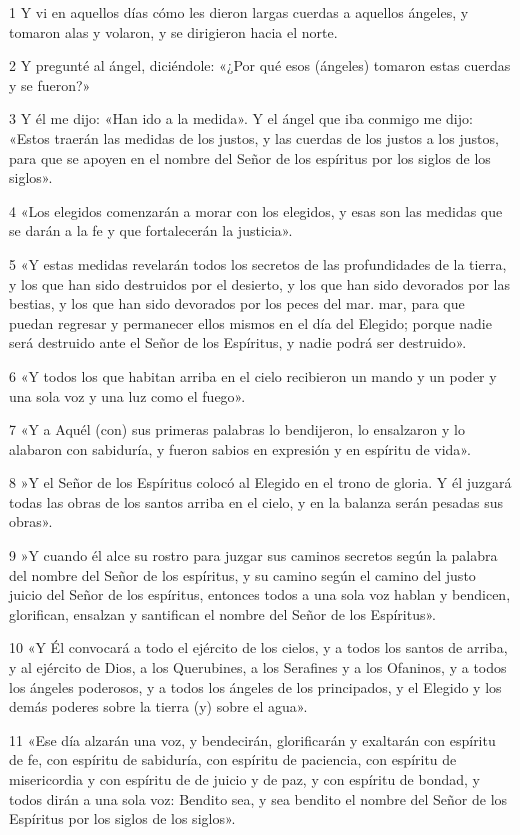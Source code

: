 \par 1 Y vi en aquellos días cómo les dieron largas cuerdas a aquellos ángeles, y tomaron alas y volaron, y se dirigieron hacia el norte.
\par 2 Y pregunté al ángel, diciéndole: «¿Por qué esos (ángeles) tomaron estas cuerdas y se fueron?»
\par 3 Y él me dijo: «Han ido a la medida». Y el ángel que iba conmigo me dijo: «Estos traerán las medidas de los justos, y las cuerdas de los justos a los justos, para que se apoyen en el nombre del Señor de los espíritus por los siglos de los siglos».
\par 4 «Los elegidos comenzarán a morar con los elegidos, y esas son las medidas que se darán a la fe y que fortalecerán la justicia».
\par 5 «Y estas medidas revelarán todos los secretos de las profundidades de la tierra, y los que han sido destruidos por el desierto, y los que han sido devorados por las bestias, y los que han sido devorados por los peces del mar. mar, para que puedan regresar y permanecer ellos mismos en el día del Elegido; porque nadie será destruido ante el Señor de los Espíritus, y nadie podrá ser destruido».
\par 6 «Y todos los que habitan arriba en el cielo recibieron un mando y un poder y una sola voz y una luz como el fuego».
\par 7 «Y a Aquél (con) sus primeras palabras lo bendijeron, lo ensalzaron y lo alabaron con sabiduría, y fueron sabios en expresión y en espíritu de vida».
\par 8 »Y el Señor de los Espíritus colocó al Elegido en el trono de gloria. Y él juzgará todas las obras de los santos arriba en el cielo, y en la balanza serán pesadas sus obras».
\par 9 »Y cuando él alce su rostro para juzgar sus caminos secretos según la palabra del nombre del Señor de los espíritus, y su camino según el camino del justo juicio del Señor de los espíritus, entonces todos a una sola voz hablan y bendicen, glorifican, ensalzan y santifican el nombre del Señor de los Espíritus».
\par 10 «Y Él convocará a todo el ejército de los cielos, y a todos los santos de arriba, y al ejército de Dios, a los Querubines, a los Serafines y a los Ofaninos, y a todos los ángeles poderosos, y a todos los ángeles de los principados, y el Elegido y los demás poderes sobre la tierra (y) sobre el agua».
\par 11 «Ese día alzarán una voz, y bendecirán, glorificarán y exaltarán con espíritu de fe, con espíritu de sabiduría, con espíritu de paciencia, con espíritu de misericordia y con espíritu de de juicio y de paz, y con espíritu de bondad, y todos dirán a una sola voz: Bendito sea, y sea bendito el nombre del Señor de los Espíritus por los siglos de los siglos».

